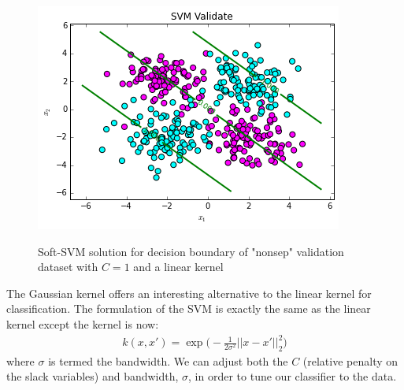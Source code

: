 \documentclass[10pt]{article}
\begin{document}
\begin{figure}
\centering
\includegraphics[scale=0.5]{svm_nonsep_val.png}
\label{svm_toy}
\caption{Soft-SVM solution for decision boundary of "nonsep" validation dataset with $C=1$ and a linear kernel}
\end{figure}


The Gaussian kernel offers an interesting alternative to the linear kernel for classification.  The formulation of the SVM is exactly the same as the linear kernel except the kernel is now:
\begin{equation}
\begin{aligned}
k(x,x') = \exp\big( - \frac{1}{2 \sigma^2} ||x-x'||_2^2  \big)
\end{aligned}
\end{equation}
where $\sigma$ is termed the bandwidth.  We can adjust both the $C$ (relative penalty on the slack variables) and bandwidth, $\sigma$, in order to tune our classifier to the data.
\end{document}
